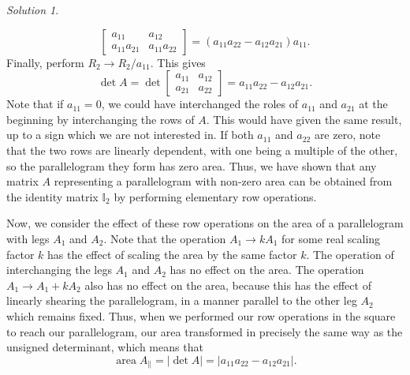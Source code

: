 \documentclass[11pt]{report}
\theoremstyle{remark}
\newtheorem*{solution}{Solution}
\begin{document}
\begin{solution}
\begin{enumerate}
\[\begin{bmatrix}
                    a_{11} & a_{12} \\ a_{11}a_{21} & a_{11}a_{22}
                \end{bmatrix} = (a_{11}a_{22} - a_{12}a_{21})a_{11}.
            \] Finally, perform $R_2 \to R_2 / a_{11}$. This gives \[
                \det {A} = \det \begin{bmatrix}
                    a_{11} & a_{12} \\ a_{21} & a_{22}
                \end{bmatrix} = a_{11}a_{22} - a_{12}a_{21}.
            \] Note that if $a_{11} = 0$, we could have interchanged the roles of
            $a_{11}$ and $a_{21}$ at the beginning by interchanging the rows of $A$.
            This would have given the same result, up to a sign which we are not
            interested in.
            If both $a_{11}$ and $a_{22}$ are zero, note that the two rows are
            linearly dependent, with one being a multiple of the other, so the
            parallelogram they form has zero area.
            Thus, we have shown that any matrix $A$ representing a parallelogram
            with non-zero area can be obtained from the identity matrix
            $\mathbb{I}_2$ by performing elementary row operations.

            Now, we consider the effect of these row operations on the area of a
            parallelogram with legs $A_1$ and $A_2$. Note that the operation $A_1
            \to kA_1$ for some real scaling factor $k$ has the effect of scaling the
            area by the same factor $k$. The operation of interchanging the legs
            $A_1$ and $A_2$ has no effect on the area. The operation $A_1 \to A_1 +
            kA_2$ also has no effect on the area, because this has the effect of
            linearly shearing the parallelogram, in a manner parallel to the other
            leg $A_2$ which remains fixed. Thus, when we performed our row
            operations in the square to reach our parallelogram, our area
            transformed in precisely the same way as the unsigned determinant, which
            means that \[
                \operatorname{area} A_{\parallel} = |\det{A}| = |a_{11}a_{22} -
                a_{12}a_{21}|.
            \]


\end{enumerate}
\end{solution}
\end{document}
